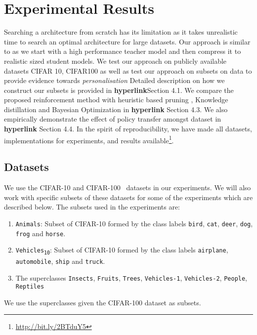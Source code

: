 \documentclass[../main]{subfiles}
\begin{document}
\section{Experimental Results}
    \label{sec:expts}
    Searching a architecture \cite{zoph2017learning,tan2018mnasnet} from scratch has its limitation as it takes unrealistic time to search an optimal architecture for large datasets. 
    Our approach is similar to \cite{ashok2017n2n,molchanov2016pruning} as we start with a high performance teacher model and then compress it to realistic sized student models.
    We test our approach on publicly available datasets CIFAR 10, CIFAR100 as well as test our approach on subsets on data to provide evidence towards \textit{personalisation} Detailed description on how we construct our subsets is provided in \textbf{hyperlink}Section 4.1.
    We compare the proposed reinforcement method with heuristic based pruning \cite{molchanov2016pruning,lecun1990optimal}, Knowledge distillation \cite{hinton2015distilling} and Bayesian Optimization \cite{jin2018efficient} in \textbf{hyperlink} Section 4.3.
    We also empirically demonstrate the effect of policy transfer amongst dataset in \textbf{hyperlink} Section 4.4.
    In the spirit of reproducibility, we have made all datasets, implementations for experiments, and results available\footnote{\url{http://bit.ly/2BTduY5}}. 
    
    \subsection{Datasets}
        \label{sec:datasets}
        We use the CIFAR-10 and CIFAR-100~\cite{krizhevsky2009learning} datasets in our experiments.
        We will also work with specific subsets of these datasets for some of the experiments which are described below. The subsets used in the experiments are:
        \begin{enumerate}
            \item   \texttt{Animals}: Subset of CIFAR-10 formed by the class labels \texttt{bird}, \texttt{cat}, \texttt{deer}, \texttt{dog}, \texttt{frog} and \texttt{horse}.
            \item   \texttt{Vehicles\textsubscript{10}}: Subset of CIFAR-10 formed by the class labels \texttt{airplane}, \texttt{automobile}, \texttt{ship} and \texttt{truck}.
            \item   The superclasses \texttt{Insects}, \texttt{Fruits}, \texttt{Trees}, \texttt{Vehicles-1}, \texttt{Vehicles-2}, \texttt{People}, \texttt{Reptiles}
        \end{enumerate}
        We use the superclasses given the CIFAR-100 dataset as subsets.
        
\end{document}
